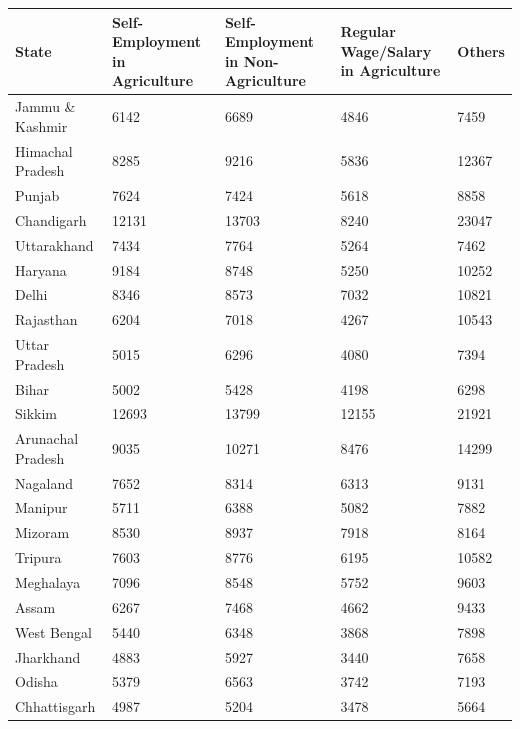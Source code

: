 \documentclass{article}
\begin{document}
	\begin{longtable}{|p{4cm}|p{3cm}|p{3cm}|p{3cm}|p{3cm}|}
		\hline
		\textbf{State} & \textbf{Self-Employment in Agriculture} & \textbf{Self-Employment in Non-Agriculture} & \textbf{Regular Wage/Salary in Agriculture} & \textbf{Others} \\ \hline
		\endhead
		
		Jammu \& Kashmir    & 6142  & 6689  & 4846  & 7459  \\ \hline
		Himachal Pradesh   & 8285  & 9216  & 5836  & 12367 \\ \hline
		Punjab             & 7624  & 7424  & 5618  & 8858  \\ \hline
		Chandigarh         & 12131 & 13703 & 8240  & 23047 \\ \hline
		Uttarakhand        & 7434  & 7764  & 5264  & 7462  \\ \hline
		Haryana            & 9184  & 8748  & 5250  & 10252 \\ \hline
		Delhi              & 8346  & 8573  & 7032  & 10821 \\ \hline
		Rajasthan          & 6204  & 7018  & 4267  & 10543 \\ \hline
		Uttar Pradesh      & 5015  & 6296  & 4080  & 7394  \\ \hline
		Bihar              & 5002  & 5428  & 4198  & 6298  \\ \hline
		Sikkim             & 12693 & 13799 & 12155 & 21921 \\ \hline
		Arunachal Pradesh  & 9035  & 10271 & 8476  & 14299 \\ \hline
		Nagaland           & 7652  & 8314  & 6313  & 9131  \\ \hline
		Manipur            & 5711  & 6388  & 5082  & 7882  \\ \hline
		Mizoram            & 8530  & 8937  & 7918  & 8164  \\ \hline
		Tripura            & 7603  & 8776  & 6195  & 10582 \\ \hline
		Meghalaya          & 7096  & 8548  & 5752  & 9603  \\ \hline
		Assam              & 6267  & 7468  & 4662  & 9433  \\ \hline
		West Bengal        & 5440  & 6348  & 3868  & 7898  \\ \hline
		Jharkhand          & 4883  & 5927  & 3440  & 7658  \\ \hline
		Odisha             & 5379  & 6563  & 3742  & 7193  \\ \hline
		Chhattisgarh       & 4987  & 5204  & 3478  & 5664  \\ \hline

\end{longtable}
\end{document}
